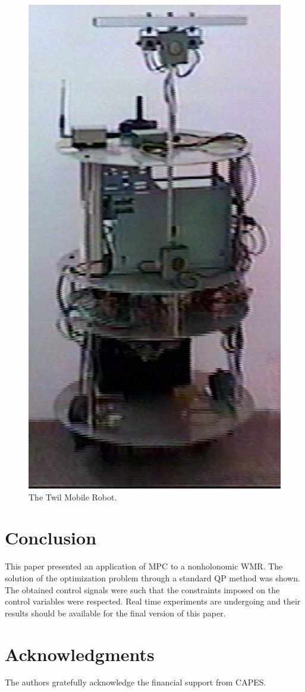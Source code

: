 \documentclass[conference]{IEEEtran} %
\begin{document}
\begin{figure}[htbp]
\begin{center}
\includegraphics[width=0.65\linewidth]{Figures/twil6.ps}
\caption{The Twil Mobile Robot.}
\label{fig:twil}
\end{center}
\end{figure}

\section{Conclusion}\label{sec:conclusions}

This paper presented an application of MPC to a nonholonomic WMR. The
solution of the optimization problem through a standard QP method was shown.
The obtained control signals were such that the constraints imposed on the
control variables were respected. Real time experiments are undergoing and
their results should be available for the final version of this paper.

\section{Acknowledgments}

The authors gratefully acknowledge the financial support from CAPES.



\end{document}
